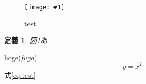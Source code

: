 \documentclass[uplatex, 11pt, a4j, dvipdfmx]{jsarticle}
\newcommand*{\myTerm}[2]{\textsf{#1}{(\emph{#2})}}
\newtheorem{dfn}{定義}
\newcommand{\fig}[4]{\begin{figure}[#4]\begin{center}\texttt{[image: \#1]}\caption{#2}\label{fig:#3}\end{center}\end{figure}}
\newcommand{\figref}[1]{図\ref{fig:#1}}
\begin{document}
\fig{images/hoge.png}{test}{a}{H}
\begin{dfn}
  \figref{a}あ
\end{dfn}
\myTerm{hoge}{fuga}
\begin{equation}
\label{eq:test}
y = x^2
\end{equation}
\newpage
式\eqref{eq:test}
\end{document}
